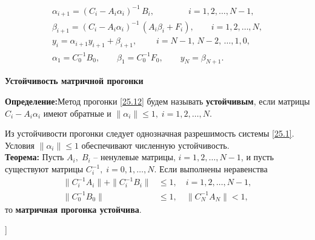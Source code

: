 \begin{equation}\label{25.12}
    \begin{gathered}
            \alpha_{i+1}  =(C_i - A_i \alpha_i)^{-1} \, B_i, \quad\qquad\quad i = 1,2, \ldots, N-1,\\
    \beta_{i+1} = (C_i - A_i \alpha_i)^{-1} \,(A_i \beta_i + F_i), \quad\quad i = 1,2, \ldots, N,\\
    y_i = \alpha_{i+1} y_{i+1} + \beta_{i+1}, \qquad\; i = N-1, \,N-2, \,\ldots, 1, 0,\\
    \alpha_1  = C_0^{-1}B_0,\qquad
    \beta_1 = C_0^{-1}F_0,\qquad
    y_N = \beta_{N+1}. 
    \end{gathered}
\end{equation}

\textbf{Устойчивость матричной прогонки}

\textbf{Определение:\;}Метод прогонки \eqref{25.12} будем называть \textbf{устойчивым}, если матрицы $C_i - A_i \alpha_i$ имеют обратные и $\|\alpha_i\|\leq 1, \; i = 1, 2, \ldots, N$.

Из устойчивости прогонки следует однозначная разрешимость системы \eqref{25.1}. Условия $\|\alpha_i\|\leq 1$ обеспечивают численную устойчивость.\\

\textbf{Теорема:\;} Пусть $A_i, \; B_i$ -- ненулевые матрицы, $i = 1, 2, \ldots, N-1$, и пусть существуют матрицы $C_i^{-1}, \; i = 0, 1, \ldots, N$. Если выполнены неравенства
\begin{align*}
    \|C_i^{-1} A_i\| + \|C_i^{-1} B_i\| &\leq 1, \quad i = 1, 2, \ldots, N-1,\\
    \|C_0^{-1} B_0\| &\leq 1, \quad \|C_N^{-1} A_N\| < 1,
\end{align*}
то \textbf{матричная прогонка устойчива}.


\bigbreak
[\cite[pages 45-47, 411-418]{chm_samarski_gulin}]